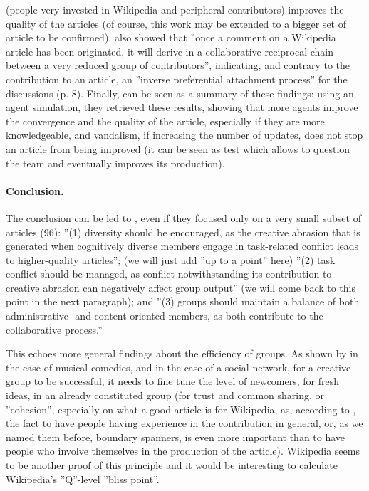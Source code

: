 (people very invested in Wikipedia and peripheral contributors) improves
the quality of the articles (of course, this work may be extended
to a bigger set of article to be confirmed). \citet{GomezKappenKaltenbrunner11}
also showed that ''once a comment on a Wikipedia article has been
originated, it will derive in a collaborative reciprocal chain between
a very reduced group of contributors'', indicating, and contrary
to the contribution to an article, an ''inverse preferential attachment
process'' for the discussions (p. 8). Finally, \citet{XuYilmazZhang08}
can be seen as a summary of these findings: using an agent simulation,
they retrieved these results, showing that more agents improve the
convergence and the quality of the article, especially if they are
more knowledgeable, and vandalism, if increasing the number of updates,
does not stop an article from being improved (it can be seen as test
which allows to question the team and eventually improves its production).

\paragraph{Conclusion.}

The conclusion can be led to \citet{Arazyetal11}, even if they focused
only on a very small subset of articles (96): ''(1) diversity should
be encouraged, as the creative abrasion that is generated when cognitively
diverse members engage in task-related conflict leads to higher-quality
articles''; (we will just add ''up to a point'' here) ''(2) task
conflict should be managed, as conflict notwithstanding its contribution
to creative abrasion can negatively affect group output'' (we will
come back to this point in the next paragraph); and ''(3) groups
should maintain a balance of both administrative- and content-oriented
members, as both contribute to the collaborative process.''

This echoes more general findings about the efficiency of groups.
As shown by \citet{UzziSpiro05} in the case of musical comedies,
and \citet{Uzzi08} in the case of a social network, for a creative
group to be successful, it needs to fine tune the level of newcomers,
for fresh ideas, in an already constituted group (for trust and common
sharing, or ''cohesion'', especially on what a good article is for
Wikipedia, as, according to \citet{ArazyNov10}, the fact to have
people having experience in the contribution in general, or, as we
named them before, boundary spanners, is even more important than
to have people who involve themselves in the production of the article).
Wikipedia seems to be another proof of this principle and it would
be interesting to calculate Wikipedia's ''Q''-level ''bliss point''.

